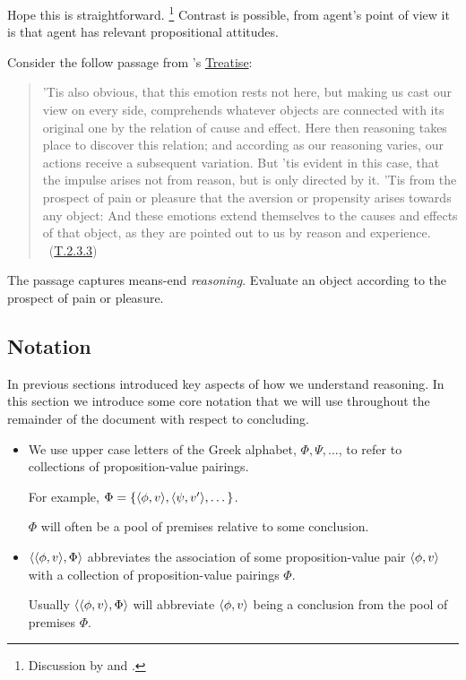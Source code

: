 \begin{note}
  Hope this is straightforward.%
  \footnote{
    Discussion by \citeauthor{Collins:1997wn} and \citeauthor{Dancy:2000aa}.
  }
  Contrast is possible, from agent's point of view it is that agent has relevant propositional attitudes.

  Consider the follow passage from \citeauthor{Hume:2011aa}'s \hyperlink{cite.Hume:2011aa}{Treatise}:

  \begin{quote}
    ’Tis also obvious, that this emotion rests not here, but making us cast our view on every side, comprehends whatever objects are connected with its original one by the relation of cause and effect.
    Here then reasoning takes place to discover this relation; and according as our reasoning varies, our actions receive a subsequent variation.
    But ’tis evident in this case, that the impulse arises not from reason, but is only directed by it.
    ’Tis from the prospect of pain or pleasure that the aversion or propensity arises towards any object: And these emotions extend themselves to the causes and effects of that object, as they are pointed out to us by reason and experience.%
    \mbox{ }\hfill\mbox{(\hyperlink{cite.Hume:2011aa}{T.2.3.3})}
  \end{quote}

  The passage captures means-end \emph{reasoning}.
  Evaluate an object according to the prospect of pain or pleasure.
\end{note}

\subsection{Notation}

\begin{note}
  In previous sections introduced key aspects of how we understand reasoning.
  In this section we introduce some core notation that we will use throughout the remainder of the document with respect to concluding.
\end{note}

\begin{note}
  \begin{itemize}
  \item
    We use upper case letters of the Greek alphabet, \(\Phi, \Psi, \dots\), to refer to collections of proposition-value pairings.

    For example, \(\Phi = \{ \langle \phi, v \rangle, \langle \psi, v' \rangle, \dots \}\).

    \(\Phi\) will often be a pool of premises relative to some conclusion.
  \item
    \(\langle \langle \phi, v \rangle, \Phi \rangle\) abbreviates the association of some proposition-value pair \(\langle \phi, v \rangle\) with a collection of proposition-value pairings \(\Phi\).

    Usually \(\langle \langle \phi, v \rangle, \Phi \rangle\) will abbreviate \(\langle \phi, v \rangle\) being a conclusion from the pool of premises \(\Phi\).
  \end{itemize}
\end{note}

